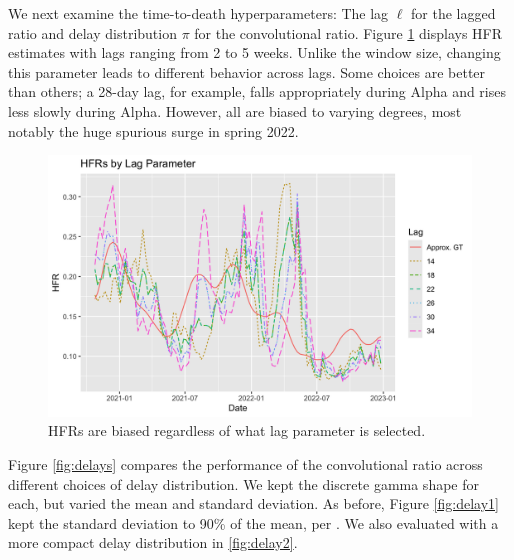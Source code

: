\documentclass{article}
\begin{document}
We next examine the time-to-death hyperparameters: The lag $\ell$ for the lagged ratio and delay distribution $\pi$ for the convolutional ratio. Figure \ref{fig:lag} displays HFR estimates with lags ranging from 2 to 5 weeks. Unlike the window size, changing this parameter leads to different behavior across lags. Some choices are better than others; a 28-day lag, for example, falls appropriately during Alpha and rises less slowly during Alpha. However, all are biased to varying degrees, most notably the huge spurious surge in spring 2022.

\begin{figure}
    \centering
    \includegraphics[width=0.7\linewidth]{Figs/hfrs_by_lag.png}
    \caption{HFRs are biased regardless of what lag parameter is selected.}
    \label{fig:lag}
\end{figure}

Figure \ref{fig:delays} compares the performance of the convolutional ratio across different choices of delay distribution. We kept the discrete gamma shape for each, but varied the mean and standard deviation. As before, Figure \ref{fig:delay1} kept the standard deviation to 90\% of the mean, per \citet{UKdelay}. We also evaluated with a more compact delay distribution in \ref{fig:delay2}. 

\end{document}
